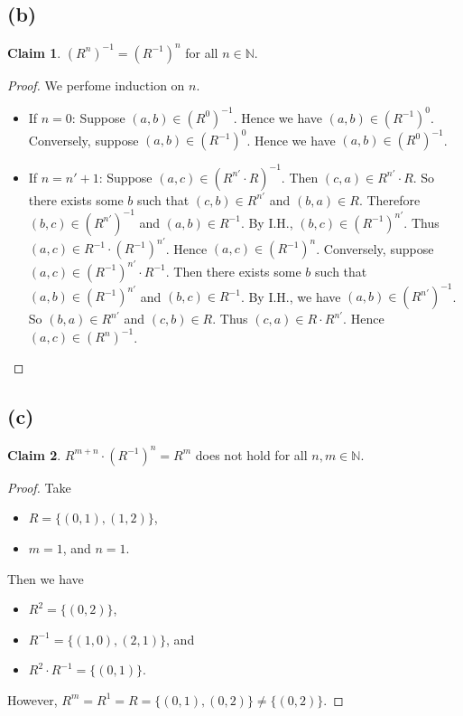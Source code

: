 \documentclass[autodetect-enginem]{article}
\theoremstyle{plain}
\theoremstyle{definition}
\theoremstyle{definition}
\newtheorem*{claim}{Claim}
\begin{document}
\subsection*{(b)}
    \begin{claim}
        $(R^n)^{-1} = (R^{-1})^n$ for all $n \in \mathbb{N}$.
    \end{claim}
    \begin{proof}
        We perfome induction on $n$.
        \begin{itemize}
            \item If $n = 0$: Suppose $(a,b) \in (R^0)^{-1}$.
                    Hence we have $(a,b) \in (R^{-1})^0$.
                    Conversely, suppose $(a,b) \in (R^{-1})^0$.
                    Hence we have $(a,b) \in (R^0)^{-1}$.
            \item If $n = n' + 1$: Suppose $(a,c) \in (R^{n'} \cdot R)^{-1}$.
                    Then $(c,a) \in R^{n'} \cdot R$.
                    So there exists some $b$ such that $(c,b) \in R^{n'}$ and $(b,a) \in R$.
                    Therefore $(b,c) \in (R^{n'})^{-1}$ and $(a,b) \in R^{-1}$.
                    By I.H., $(b,c) \in (R^{-1})^{n'}$.
                    Thus $(a,c) \in R^{-1} \cdot (R^{-1})^{n'}$.
                    Hence $(a,c) \in (R^{-1})^{n}$.
                    Conversely, suppose $(a,c) \in (R^{-1})^{n'} \cdot R^{-1}$.
                    Then there exists some $b$ such that $(a,b) \in (R^{-1})^{n'}$ and $(b,c) \in R^{-1}$.
                    By I.H., we have $(a,b) \in (R^{n'})^{-1}$.
                    So $(b,a) \in R^{n'}$ and $(c,b) \in R$.
                    Thus $(c,a) \in R \cdot R^{n'}$.
                    Hence $(a,c) \in (R^{n})^{-1}$.
            \end{itemize}
    \end{proof}

\subsection*{(c)}
    \begin{claim}
        $R^{m+n} \cdot (R^{-1})^n = R^m$ does not hold for all $n,m \in \mathbb{N}$.
    \end{claim}
    \begin{proof}
        Take
            \begin{itemize}
                \item $R =\{(0,1), (1,2)\}$,
                \item $m=1$, and $n=1$.
            \end{itemize}
        Then we have
            \begin{itemize}
                \item $R^2 = \{(0,2)\}$,
                \item $R^{-1} = \{(1,0), (2,1)\}$, and
                \item $R^2 \cdot R^{-1} = \{(0,1)\}$.
            \end{itemize}
        However, $R^m = R^1 = R = \{(0,1), (0,2)\} \neq \{(0,2)\}$.
    \end{proof}
\end{document}
